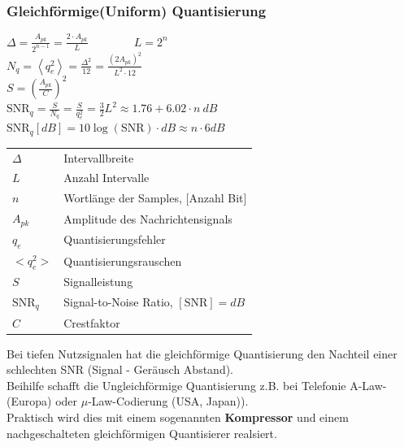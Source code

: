 \subsubsection{Gleichförmige(Uniform) Quantisierung}
\begin{multicols}{2}
	$ \Delta = \frac{A_{pk}}{2^{n-1}} = \frac{2 \cdot A_{pk}}{L} \qquad \qquad L =
	2^n$\\
	$ N_q = \left< q_e^2 \right> = \frac{\Delta^2}{12} =
	\frac{\left(2A_{pk}\right)^2}{L^2 \cdot 12}$ \\
	$ S = \left( \frac{ A_{pk} }{C} \right)^2$ \\
	$ \text{SNR}_{q} =\frac{S}{N_q}=\frac{S}{q_e^2} = \frac{3}{2}L^2
	\approx 1.76 + 6.02 \cdot n \: dB$ \\
	$\text{SNR}_{q} \left[dB\right] =10 \log(\text{SNR}) \cdot dB \approx n \cdot
	6dB$ \\
\columnbreak

	\begin{tabular}{l l}
		$\Delta$ & Intervallbreite \\
		$L$ & Anzahl Intervalle \\
		$n$ & Wortlänge der Samples, [Anzahl Bit] \\
		$A_{pk}$ & Amplitude des Nachrichtensignals \\
		$q_e$ & Quantisierungsfehler \\
		$<q_e^2>$ & Quantisierungsrauschen \\
		$S$ & Signalleistung\\
		$\text{SNR}_{q}$ & Signal-to-Noise Ratio, $[\text{SNR}] = dB$ \\
		$C$ & Crestfaktor \\
	\end{tabular}
\end{multicols}


Bei tiefen Nutzsignalen hat die gleichförmige Quantisierung den Nachteil einer schlechten SNR
(Signal - Geräusch Abstand). \\
Beihilfe schafft die Ungleichförmige Quantisierung z.B. bei Telefonie
A-Law-(Europa) oder $\mu$-Law-Codierung (USA, Japan)). \\
Praktisch wird dies mit einem sogenannten \textbf{Kompressor} und einem nachgeschalteten
gleichförmigen Quantisierer realsiert.

